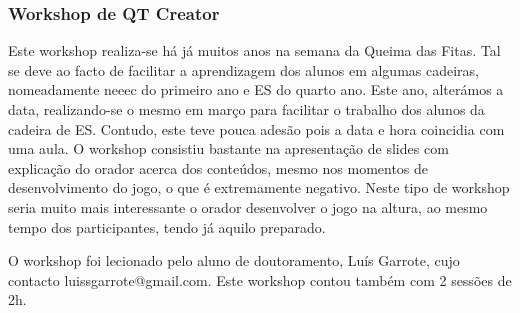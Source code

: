
\subsubsection{Workshop de QT Creator}

Este workshop realiza-se há já muitos anos na semana da Queima das Fitas. Tal se deve ao facto de facilitar a aprendizagem dos alunos em algumas cadeiras, nomeadamente \acrshort{neeec} do primeiro ano e ES do quarto ano. Este ano, alterámos a data, realizando-se o mesmo em março para facilitar o trabalho dos alunos da cadeira de ES. Contudo, este teve pouca adesão pois a data e hora coincidia com uma aula. O workshop consistiu bastante na apresentação de slides com explicação do orador acerca dos conteúdos, mesmo nos momentos de desenvolvimento do jogo, o que é extremamente negativo. Neste tipo de workshop seria muito mais interessante o orador desenvolver o jogo na altura, ao mesmo tempo dos participantes, tendo já aquilo preparado.

O workshop foi lecionado pelo aluno de doutoramento, Luís Garrote, cujo contacto luissgarrote@gmail.com. Este workshop contou também com 2 sessões de 2h.